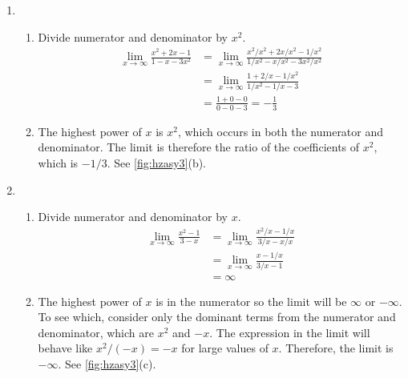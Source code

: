 {\begin{enumerate}
\begin{enumerate}
{
\\ (c)}
		\item The highest power of $x$ is in the denominator.  Therefore, the limit is 0; see \autoref{fig:hzasy3}(a).
		\end{enumerate}
	\item	\begin{enumerate}
		\item Divide numerator and denominator by $x^2$.
			\begin{align*}
				\lim_{x\to \infty} \frac{x^2+2x-1}{1-x-3x^2}
				&=\lim_{x\to\infty}
				\frac{x^2/x^2+2x/x^2-1/x^2}{1/x^2-x/x^2-3x^2/x^2}\\
				&=\lim_{x\to \infty} \frac{1+2/x-1/x^2}{1/x^2-1/x-3}\\
				&=\frac{1+0-0}{0-0-3}=-\frac{1}{3}
			\end{align*}
		\item The highest power of $x$ is $x^2$, which occurs in both the numerator and denominator.  The limit is therefore the ratio of the coefficients of $x^2$, which is $-1/3$. See \autoref{fig:hzasy3}(b).
		\end{enumerate}
	\item	\begin{enumerate}
		\item Divide numerator and denominator by $x$.
			\begin{align*}
				\lim_{x\to\infty}\frac{x^2-1}{3-x}
				&=\lim_{x\to \infty}\frac{x^2/x-1/x}{3/x-x/x}\\
				&=\lim_{x\to \infty}\frac{x-1/x}{3/x-1}\\
				&=\infty
			\end{align*}
		\item The highest power of $x$ is in the numerator so the limit will be $\infty$ or $-\infty$.  To see which, consider only the dominant terms from the numerator and denominator, which are $x^2$ and $-x$.  The expression in the limit will behave like $x^2/(-x)=-x$ for large values of $x$.  Therefore, the limit is $-\infty$. See \autoref{fig:hzasy3}(c).\eoehere
	\end{enumerate}
\end{enumerate}}



